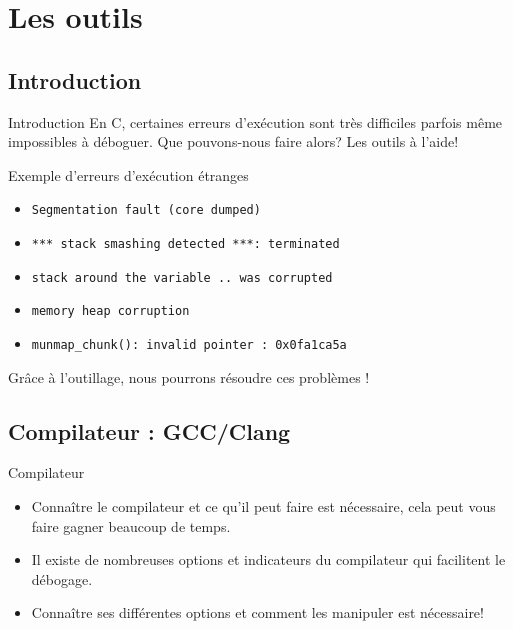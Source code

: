 \section{Les outils}
\subsection{Introduction}
\begin{frame}{Introduction}
	En C, certaines erreurs d'exécution sont très difficiles parfois même impossibles à déboguer. Que pouvons-nous faire alors? Les outils à l'aide!
	\begin{alertblock}{Exemple d'erreurs d'exécution étranges}
	\begin{itemize}
		\item \texttt{Segmentation fault (core dumped)}
		\item \texttt{*** stack smashing detected ***: terminated}
		\item \texttt{stack around the variable .. was corrupted}
		\item \texttt{memory heap corruption}
		\item \texttt{munmap\_chunk(): invalid pointer : 0x0fa1ca5a}
	\end{itemize}
	\end{alertblock}
	\begin{alertblock}{Grâce à l'outillage, nous pourrons résoudre ces problèmes !}
	\end{alertblock}
\end{frame}

\subsection{Compilateur : GCC/Clang}
\begin{frame}{Compilateur}
	\begin{itemize}
		\item Connaître le compilateur et ce qu'il peut faire est nécessaire, cela peut vous faire gagner beaucoup de temps.
		\item Il existe de nombreuses options et indicateurs du compilateur qui facilitent le débogage. 
		\item Connaître ses différentes options et comment les manipuler est nécessaire!
	\end{itemize}
\end{frame}

